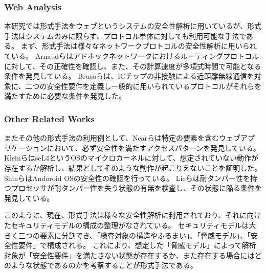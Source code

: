 \documentclass[journal]{IEEEtran}
\begin{document}
\subsubsection{Web Analysis}
本研究では形式手法をウェブというシステムの安全性解析に用いているが、形式手法はシステムのみに限らず、プロトコル単体に対しても利用可能な手法である。
まず、形式手法は様々なネットワークプロトコルの安全性解析に用いられている。
Arnaudら\cite{modeling-and-verifying-ad-hoc}はアドホックネットワークにおけるルーティングプロトコルに対して、その正確性を確認し、また、その計算速度が多項式時間で可能となる条件を発見している。
Brusoら\cite{formal-verification-of-privacy-for}は、ICチップの非接触による近距離無線通信\cite{formal-verification-of-privacy-for}を対象に、二つの安全性要件を定義し一般的に用いられているプロトコルがそれらを満たすために必要な条件を発見した。

\subsubsection{Other Related Works}
またその他の形式手法の利用例として、Nearら\cite{finding_security_bugs_in_web}は特定の要素を含むウェブアプリケーションにおいて、必ず安全性を満たすアクセスパターンを発見している。
Kleinら\cite{sel4_formal_verification_of_an}はseL4というOSのマイクロカーネルに対して、想定されていない動作が存在するか解析し、結果としてそのような動作が起こりえないことを証明した。
Shinら\cite{towards_formal_analysis_of_the}はAndoroid OSの安全性の確認を行っている。
Lieら\cite{specifying_and_verifying_hardware_for_tamper}は耐タンパー性を持つプロセッサが耐タンパー性を失う状態の有無を検査し、その状態に陥る条件を発見している。

このように、現在、形式手法は様々な安全性解析に利用されており、それに向けたセキュリティモデルの構成の整理がなされている\cite{security_modeling_and_analysis}。
セキュリティモデルは大きく三つの要素に分割でき、「検査対象の構造やふるまい」、「脅威モデル」、「安全性要件」で構成される。
これにより、想定した「脅威モデル」によって解析対象が「安全性要件」を満たさない状態が存在するか、また存在する場合にはどのような状態であるのかを考察することが形式手法である。
\end{document}
